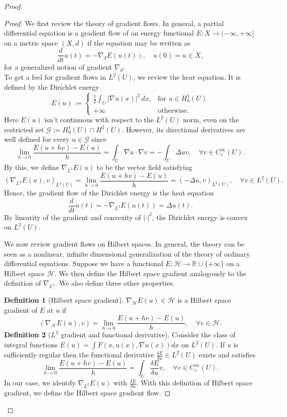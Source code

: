 \documentclass{article}
\begin{document}
\begin{flushleft}
\begin{proof}
\begin{proof}
We first review the theory of gradient flows. In general, a partial differential equation is a gradient flow of an energy functional
$E : X\to (-\infty,+\infty]$ on a metric space $(X,d)$ if the equation may be written as
$$\frac{d}{dt} u(t)= -\nabla_d E(u(t)), \quad u(0)=u\in X,$$
for a generalized notion of gradient $\nabla_d.$
\newline
\\
To get a feel for gradient flows in $L^2(U)$, we review the heat equation. It is defined by the Dirichlet energy
$$ E(u):=
  \begin{cases} 
      \frac{1}{2}\int_U |\nabla u(x)|^2\,dx, & \text{for $u\in H_0^1(U)$}\\
      +\infty & \text{otherwise}.
   \end{cases}
$$
Here $E(u)$ isn't continuous with respect to the $L^2(U)$ norm, even on the restricted set $\mathcal{G}:=H_0^1(U)\cap H^2(U)$. However, its directional derivatives are well defined for every $u\in\mathcal{G}$ since
$$\lim_{h\to 0} \frac{E(u+hv) - E(u)}{h}=\int_U \nabla u \cdot \nabla v = -\int_U \Delta u v, \quad \forall v\in C_c^{\infty}(U).$$
By this, we define $\nabla_{L^2} E(u)$ to be the vector field satisfying 
$$(\nabla_{L^2}  E(u), v)_{L^2(U)}=\lim_{h\to 0} \frac{E(u+hv) - E(u)}{h}=(-\Delta u, v)_{L^2(U)},\quad \forall v\in L^2(U).$$
Hence, the gradient flow of the Dirichlet energy is the heat equation
$$\frac{d}{dt}u(t) = -\nabla_{L^2}  E(u(t))=\Delta u(t).$$
By linearity of the gradient and convexity of $|\cdot|^2$, the Dirichlet energy is convex on $L^2(U).$

We now review gradient flows on Hilbert spaces. In general, the theory can be seen as a nonlinear, infinite dimensional
generalization of the theory of ordinary differential equations. Suppose we have a functional $E:\mathcal{H}\to \mathbb R \cup \{+\infty\}$ on a Hilbert space $\mathcal{H}$. We then define the Hilbert space gradient analogously to the definition of $\nabla_{L^2}$. We also define three other properties. 

\textbf{Definition 1} (Hilbert space gradient). $\nabla_\mathcal{H} E(u)\in\mathcal{H}$ is a Hilbert space gradient of $E$ at $u$ if
$$(\nabla_\mathcal{H} E(u),v) = \lim_{h\to 0} \frac{E(u+hv) - E(u)}{h}, \quad \forall v\in\mathcal{H}.$$
\textbf{Definition 2} ($L^2$ gradient and functional derivative). Consider the class of integral functions $E(u)=\int F(x,u(x),\nabla u(x))dx$ on $L^2(U)$. If $u$ is sufficiently regular then the functional derivative $\frac{\delta E}{\delta u}\in L^2(U)$ exists and satisfies 
$$\lim_{h\to 0} \frac{E(u+hv) - E(u)}{h} =
\int_U \frac{\delta E}{\delta u}v, \quad \forall v\in C_c^{\infty}(U).$$
In our case, we identify $\nabla_{L^2} E(u)$ with $\frac{\delta E}{\delta u}$. With this definition of Hilbert space gradient, we define the Hilbert space gradient flow.


\end{proof}
\end{proof}
\end{flushleft}
\end{document}
